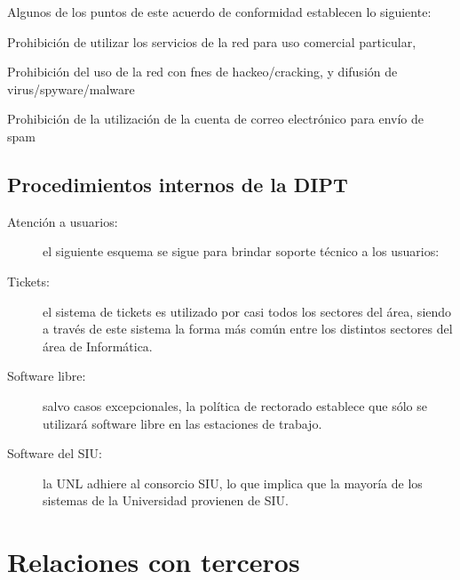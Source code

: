 \documentclass[a4paper,11pt,oneside]{article}
\begin{document}
Algunos de los puntos de este acuerdo de conformidad establecen lo
siguiente:
%
\begin{itemize*}
\item Prohibición de utilizar los servicios de la red para uso
  comercial particular,
\item Prohibición del uso de la red con fnes de hackeo/cracking, y
  difusión de virus/spyware/malware
\item Prohibición de la utilización de la cuenta de correo electrónico
  para envío de spam
\end{itemize*}
%
\subsection*{Procedimientos internos de la DIPT}
%
\begin{description}
\item[Atención a usuarios:] el siguiente esquema se sigue para brindar
  soporte técnico a los usuarios:
\item[Tickets:] el sistema de tickets es utilizado por casi todos los
  sectores del área, siendo a través de este sistema la forma más
  común entre los distintos sectores del área de Informática.
\item[Software libre:] salvo casos excepcionales, la política de
  rectorado establece que sólo se utilizará software libre en las
  estaciones de trabajo.
\item[Software del SIU:] la UNL adhiere al consorcio SIU, lo que
  implica que la mayoría de los sistemas de la Universidad provienen
  de SIU.
\end{description}
\section{Relaciones con terceros}
\end{document}
